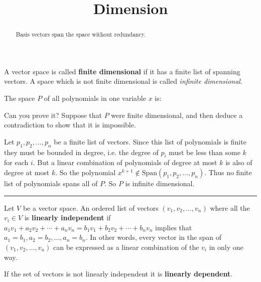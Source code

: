 \documentclass{ximera}
\title{Dimension}
\begin{document}
\begin{abstract}
  Basis vectors span the space without redundancy.
\end{abstract}\maketitle

  \begin{definition}
    A vector space is called \textbf{finite dimensional} if it has a finite list of spanning vectors.  A space which is not finite dimensional is called \textit{infinite dimensional}.
 \end{definition}

 \begin{question}
   The space $P$ of all polynomials in one variable $x$ is:

   \begin{solution}
     \begin{multiple-choice}
     \end{multiple-choice}
   \end{solution}

   Can you prove it?  Suppose that $P$ were finite dimensional, and then deduce a contradiction to show that it is impossible.

   \begin{free-response}
     Let $p_1,p_2,\ldots,p_n$ be a finite list of  vectors.  
     Since this list of polynomials is finite they must be bounded in degree, i.e.  the degree of $p_i$ must be less than some $k$ for each $i$.  But a linear combination
     of polynomials of degree at most $k$ is also of degree at most $k$.  So the polynomial $x^{k+1} \not\in  \textrm{Span}(p_1,p_2,\ldots,p_n)$. Thus no finite list of 
     polynomials spans all of $P$.  So $P$ is infinite dimensional.
   \end{free-response}

 \end{question}

\hrule

 \begin{definition}
   Let $V$ be a vector space. An ordered list of vectors $(v_1,v_2,\ldots,v_n)$ where all the $v_i \in V$ is \textbf{linearly independent} if
   $a_1v_1+a_2v_2 + \cdots +a_nv_n = b_1v_1 + b_2v_2 + \cdots + b_nv_n$ implies that $a_1  = b_1, a_2 = b_2, \ldots,a_n=b_n$.  In other words,
   every vector in the span of $(v_1,v_2,\ldots,v_n)$ can be expressed as a linear combination of the $v_i$ in only one way.  
   
   If the set of vectors is not linearly independent it is \textbf{linearly dependent}.
 \end{definition}
 
\end{document}
